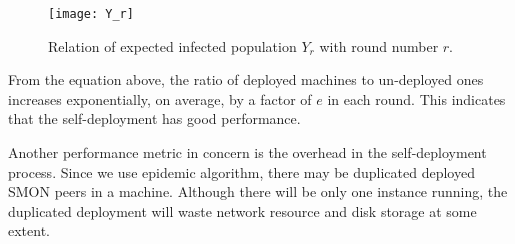 \begin{figure}
\centering
\texttt{[image: Y\_r]}
\caption{Relation of expected infected population $Y_r$ with
round number $r$.}
\label{fig:yr}
\end{figure}

From the equation above, the ratio of deployed machines to
un-deployed ones increases exponentially, on average, by a
factor of $e$ in each round.  This indicates that the
self-deployment has good performance.
%
%
%


Another performance metric in concern is the overhead in
the self-deployment process. Since we use epidemic
algorithm, there may be duplicated deployed SMON peers in a
machine. Although there will be only one instance running,
the duplicated deployment will waste network resource and
disk storage at some extent.

